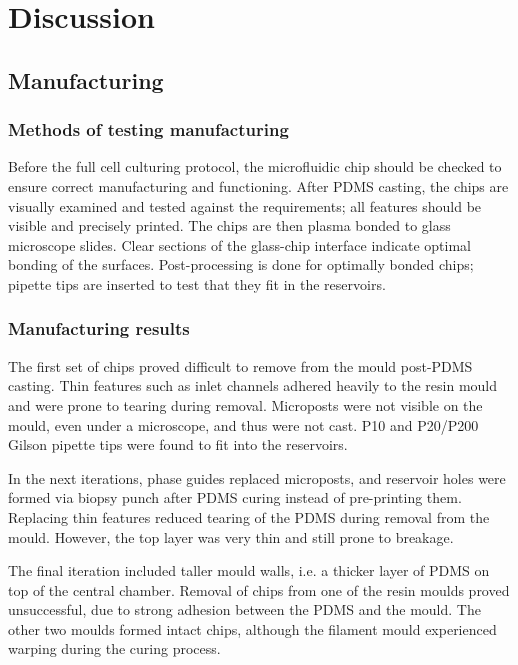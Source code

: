 \documentclass[letterpaper,12pt]{article}
\begin{document}
\section{Discussion}
\subsection{Manufacturing}

\subsubsection{Methods of testing manufacturing} \label{manufacture_test}  

Before the full cell culturing protocol, the microfluidic chip should be checked to ensure correct manufacturing and functioning. After PDMS casting, the chips are visually examined and tested against the requirements; all features should be visible and precisely printed. The chips are then plasma bonded to glass microscope slides. Clear sections of the glass-chip interface indicate optimal bonding of the surfaces. Post-processing is done for optimally bonded chips; pipette tips are inserted to test that they fit in the reservoirs.  


\subsubsection{Manufacturing results}  

The first set of chips proved difficult to remove from the mould post-PDMS casting. Thin features such as inlet channels adhered heavily to the resin mould and were prone to tearing during removal.  Microposts were not visible on the mould, even under a microscope, and thus were not cast. P10 and P20/P200 Gilson pipette tips were found to fit into the reservoirs. 

In the next iterations, phase guides replaced microposts, and reservoir holes were formed via biopsy punch after PDMS curing instead of pre-printing them. Replacing thin features reduced tearing of the PDMS during removal from the mould. However, the top layer was very thin and still prone to breakage. 

The final iteration included taller mould walls, i.e. a thicker layer of PDMS on top of the central chamber. Removal of chips from one of the resin moulds proved unsuccessful, due to strong adhesion between the PDMS and the mould. The other two moulds formed intact chips, although the filament mould experienced warping during the curing process.  
\end{document}
